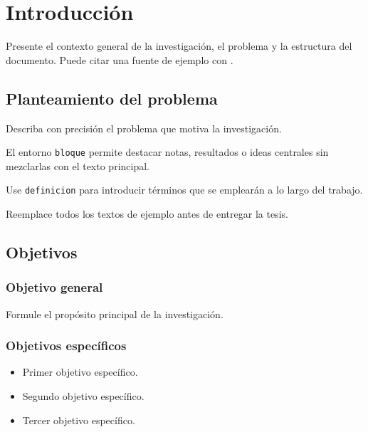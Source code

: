 \chapter{Introducción}
\label{cap:introduccion}

Presente el contexto general de la investigación, el problema y la estructura
del documento. Puede citar una fuente de ejemplo con \textcite{ejemplo2026}.

\section{Planteamiento del problema}

Describa con precisión el problema que motiva la investigación.

\begin{bloque}
  El entorno \texttt{bloque} permite destacar notas, resultados o ideas
  centrales sin mezclarlas con el texto principal.
\end{bloque}

\begin{definicion}
  Use \texttt{definicion} para introducir términos que se emplearán a lo largo
  del trabajo.
\end{definicion}

\begin{advertencia}
  Reemplace todos los textos de ejemplo antes de entregar la tesis.
\end{advertencia}

\section{Objetivos}

\subsection{Objetivo general}

Formule el propósito principal de la investigación.

\subsection{Objetivos específicos}

\begin{itemize}
  \item Primer objetivo específico.
  \item Segundo objetivo específico.
  \item Tercer objetivo específico.
\end{itemize}
